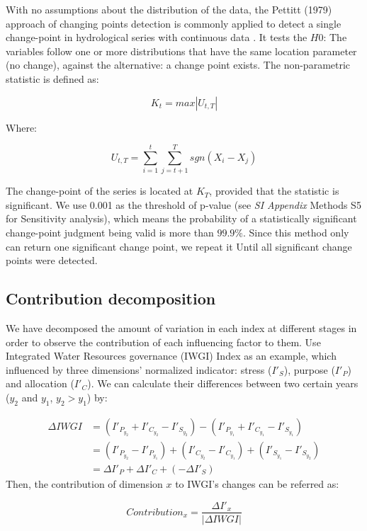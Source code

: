 \documentclass[9pt, twocolumn, twoside, lineno]{pnas-new}
\begin{document}
{		With no assumptions about the distribution of the data, the Pettitt (1979) approach of changing points detection is commonly applied to detect a single change-point in hydrological series with continuous data \cite{pettittNonParametricApproachChangePoint1979}. 
		It tests the $H0$: The variables follow one or more distributions that have the same location parameter (no change), against the alternative: a change point exists. The non-parametric statistic is defined as:
	
		$$ K_t = max|U_{t, T}|$$

		Where:

		$$ U_{t, T} = \sum_{i=1}^t\sum_{j=t+1}^T sgn(X_i - X_j) $$
	
		The change-point of the series is located at $K_T$, provided that the statistic is significant. We use 0.001 as the threshold  of p-value (see \textit{SI Appendix} Methods S5 for Sensitivity analysis), which means the probability of a statistically significant change-point judgment being valid is more than $99.9\%$.
		Since this method only can return one significant change point, we repeat it Until all significant change points were detected.
	
	\subsection*{Contribution decomposition}
		We have decomposed the amount of variation in each index at different stages in order to observe the contribution of each influencing factor to them. Use Integrated Water Resources governance (IWGI) Index as an example, which influenced by three dimensions' normalized indicator: stress ($I'_S$), purpose ($I'_P$) and allocation ($I'_C$). We can calculate their differences between two certain years ($y_2$ and $y_1$, $y_2 > y_1$) by:

		\begin{align*}
			\Delta IWGI &= (I'_{P_{y_2}} + I'_{C_{y_2}} - I'_{S_{y_2}}) - (I'_{P_{y_1}} + I'_{C_{y_1}} - I'_{S_{y_1}}) \\
			&= (I'_{P_{y_2}} - I'_{P_{y_1}}) + (I'_{C_{y_2}} - I'_{C_{y_1}}) + (I'_{S_{y_1}} - I'_{S_{y_2}}) \\
			&= \Delta I'_P + \Delta I'_C + (-\Delta I'_S)
		\end{align*}
		Then, the contribution of dimension $x$ to IWGI's changes can be referred as:

		$$ Contribution_x = \frac{\Delta I'_x}{|\Delta IWGI|} $$

}
\end{document}
